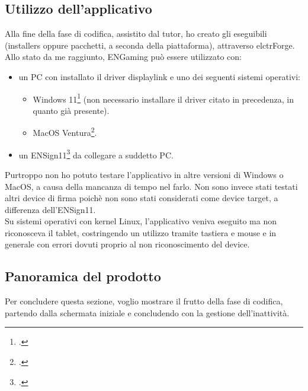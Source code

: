 \newpage
\subsection{Utilizzo dell'applicativo}
Alla fine della fase di codifica, assistito dal tutor, ho creato gli eseguibili (installers oppure pacchetti, a seconda della piattaforma), attraverso \Gls{elctrForge}.\\
Allo stato da me raggiunto, ENGaming può essere utilizzato con:
\begin{itemize}
    \item un PC con installato il driver \gls{displaylink} e uno dei seguenti sistemi operativi: \begin{itemize}
    \item Windows 11\footcite{site:w11} (non necessario installare il driver citato in precedenza, in quanto già presente).
    \item MacOS Ventura\footcite{site:macosVentura}.
    \end{itemize}
    \item un ENSign11\footcite{site:ensign11} da collegare a suddetto PC.
\end{itemize}
Purtroppo non ho potuto testare l'applicativo in altre versioni di Windows o MacOS, a causa della mancanza di tempo nel farlo. Non sono invece stati testati altri device di firma poichè non sono stati considerati come device target, a differenza dell'ENSign11.\\
Su sistemi operativi con kernel Linux, l'applicativo veniva eseguito ma non riconosceva il tablet, costringendo un utilizzo tramite tastiera e mouse e in generale con errori dovuti proprio al non riconoscimento del device.
\newpage
\subsection{Panoramica del prodotto}
\label{subsec:panoramicaProdotto}
Per concludere questa sezione, voglio mostrare il frutto della fase di codifica, partendo dalla schermata iniziale e concludendo con la gestione dell'inattività.\\
